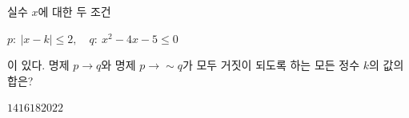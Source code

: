 실수 $x$에 대한 두 조건 \begin{center}$p:\ |x-k|\le 2,\quad q:\ x^2-4x-5\le 0$\end{center} 이 있다. 명제 $p\longrightarrow q$와 명제 $p\longrightarrow \sim q$가 모두 거짓이 되도록 하는 모든 정수 $k$의 값의 합은?
\begin{choices32}{$14$}{$16$}{$18$}{$20$}{$22$}\end{choices32}
